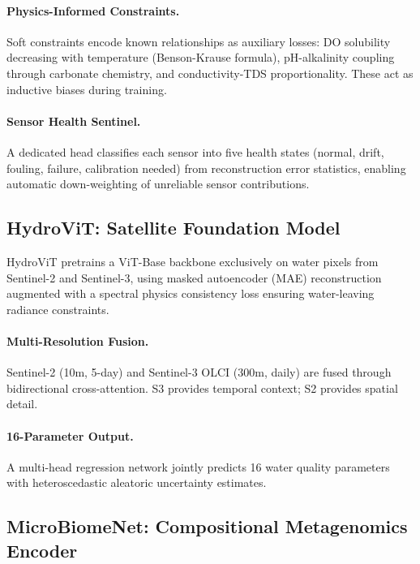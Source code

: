 \paragraph{Physics-Informed Constraints.}
Soft constraints encode known relationships as auxiliary losses:
DO solubility decreasing with temperature (Benson-Krause formula),
pH-alkalinity coupling through carbonate chemistry, and
conductivity-TDS proportionality. These act as inductive biases
during training.

\paragraph{Sensor Health Sentinel.}
A dedicated head classifies each sensor into five health states
(normal, drift, fouling, failure, calibration needed) from
reconstruction error statistics, enabling automatic down-weighting
of unreliable sensor contributions.

\subsection{HydroViT: Satellite Foundation Model}
\label{sec:hydrovit}

HydroViT pretrains a ViT-Base backbone exclusively on water pixels
from Sentinel-2 and Sentinel-3, using masked autoencoder (MAE)
reconstruction~\citep{He2022} augmented with a spectral physics
consistency loss ensuring water-leaving radiance constraints.

\paragraph{Multi-Resolution Fusion.}
Sentinel-2 (10m, 5-day) and Sentinel-3 OLCI (300m, daily) are fused
through bidirectional cross-attention. S3 provides temporal context;
S2 provides spatial detail.

\paragraph{16-Parameter Output.}
A multi-head regression network jointly predicts 16 water quality
parameters with heteroscedastic aleatoric uncertainty estimates.

\subsection{MicroBiomeNet: Compositional Metagenomics Encoder}
\label{sec:microbiomenet}

